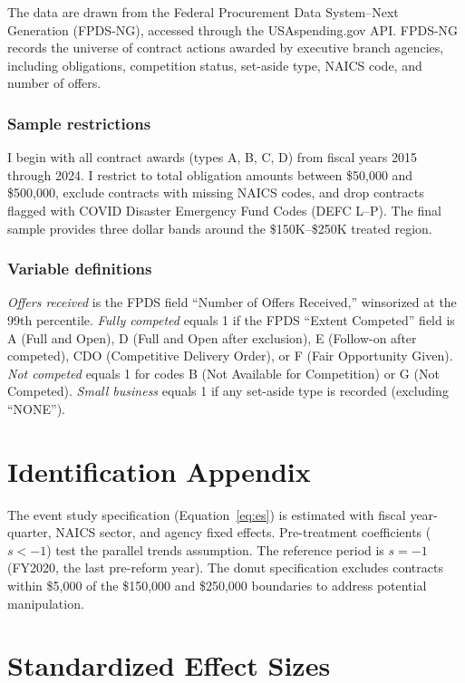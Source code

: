 \documentclass[12pt]{article}
\begin{document}
The data are drawn from the Federal Procurement Data System--Next Generation (FPDS-NG), accessed through the USAspending.gov API. FPDS-NG records the universe of contract actions awarded by executive branch agencies, including obligations, competition status, set-aside type, NAICS code, and number of offers.

\subsubsection*{Sample restrictions} I begin with all contract awards (types A, B, C, D) from fiscal years 2015 through 2024. I restrict to total obligation amounts between \$50,000 and \$500,000, exclude contracts with missing NAICS codes, and drop contracts flagged with COVID Disaster Emergency Fund Codes (DEFC L--P). The final sample provides three dollar bands around the \$150K--\$250K treated region.

\subsubsection*{Variable definitions} \textit{Offers received} is the FPDS field ``Number of Offers Received,'' winsorized at the 99th percentile. \textit{Fully competed} equals 1 if the FPDS ``Extent Competed'' field is A (Full and Open), D (Full and Open after exclusion), E (Follow-on after competed), CDO (Competitive Delivery Order), or F (Fair Opportunity Given). \textit{Not competed} equals 1 for codes B (Not Available for Competition) or G (Not Competed). \textit{Small business} equals 1 if any set-aside type is recorded (excluding ``NONE'').

\section{Identification Appendix}
\label{sec:id_app}

The event study specification (Equation~\ref{eq:es}) is estimated with fiscal year-quarter, NAICS sector, and agency fixed effects. Pre-treatment coefficients ($s < -1$) test the parallel trends assumption. The reference period is $s = -1$ (FY2020, the last pre-reform year). The donut specification excludes contracts within \$5,000 of the \$150,000 and \$250,000 boundaries to address potential manipulation.

\section{Standardized Effect Sizes}
\label{sec:sde}


\end{document}
